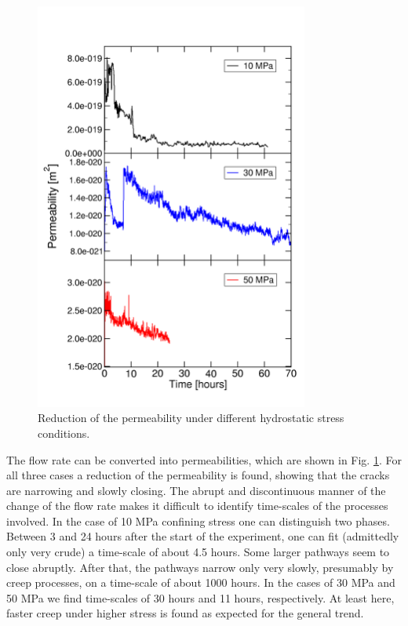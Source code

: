 \begin{figure}[!ht]
\centering
\includegraphics[width=9cm]{figures/mex3-perme-time-comparison.png}
\caption{Reduction of the permeability under different hydrostatic stress conditions.}
\label{fig:ME3-perme-exp}
\end{figure}

The flow rate can be converted into permeabilities, which are shown in Fig. \ref{fig:ME3-perme-exp}. For all three cases a reduction of the permeability is found,  showing that the cracks are narrowing and slowly closing. The abrupt and discontinuous manner of the change of the flow rate makes it difficult to identify time-scales of the processes involved. In the case of 10 MPa confining stress one can distinguish two phases. Between 3 and 24 hours after the start of the experiment, one can fit (admittedly only very crude) a time-scale of about 4.5 hours. Some larger pathways seem to close abruptly. After that, the pathways narrow only very slowly, presumably by creep processes, on a time-scale of about 1000 hours. In the cases of 30 MPa and 50 MPa we find time-scales of 30 hours and 11 hours, respectively. At least here, faster creep under higher stress is found as expected for the general trend.

